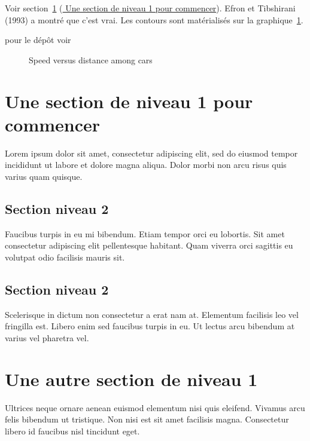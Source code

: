 \documentclass[
  9pt,
  a4paper,
  DIV=11]{scrreprt}
\begin{document}
Voir section~\ref{sec-ledebut} (\hyperref[sec-ledebut]{ Une section de
niveau 1 pour commencer}). Efron et Tibshirani (1993) a montré que c'est
vrai. Les contours sont matérialisés sur la graphique~\ref{fig-cars}.

pour le dépôt voir 

\begin{figure}[H]

\caption{\label{fig-cars}Speed versus distance among cars}


\end{figure}%

\chapter{Une section de niveau 1 pour commencer}\label{sec-ledebut}

Lorem ipsum dolor sit amet, consectetur adipiscing elit, sed do eiusmod
tempor incididunt ut labore et dolore magna aliqua. Dolor morbi non arcu
risus quis varius quam quisque.

\section{Section niveau 2}\label{sec-cacontinue}

Faucibus turpis in eu mi bibendum. Etiam tempor orci eu lobortis. Sit
amet consectetur adipiscing elit pellentesque habitant. Quam viverra
orci sagittis eu volutpat odio facilisis mauris sit.

\section{Section niveau 2}\label{sec-encore}

Scelerisque in dictum non consectetur a erat nam at. Elementum facilisis
leo vel fringilla est. Libero enim sed faucibus turpis in eu. Ut lectus
arcu bibendum at varius vel pharetra vel.

\chapter{Une autre section de niveau 1}\label{sec-etencore}

Ultrices neque ornare aenean euismod elementum nisi quis eleifend.
Vivamus arcu felis bibendum ut tristique. Non nisi est sit amet
facilisis magna. Consectetur libero id faucibus nisl tincidunt eget.
\end{document}
